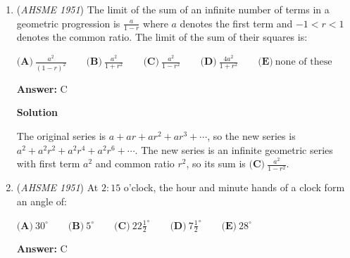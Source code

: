 \begin{enumerate}
 \textbf{Answer: }C



\textbf{Solution}

The well-known area formula for a circle is $A = \pi r^2$, so doubling the radius will result it quadrupling the area (since $A' = \pi (2r)^2 = 4 \pi r^2 = 4A$). Statement $\boxed{\textbf{(C)}}$ is therefore incorrect, and is the correct answer choice.

 
Statements $\textbf{(A)}$ and $\textbf{(B)}$ are evidently correct, since in triangles the area is directly proportional to both the base and the height ($A = \frac{1}{2} bh$). Statement $\textbf{(D)}$ is also correct: let $q = \frac{a}{b}$. Then $q' = \frac{a \div 2}{2b} = \frac{a}{4b} = \frac{q}{4}$, which is a change from $q$. Finally, statement $\textbf{(E)}$ is true: $2x < x$ if $x < 0$, as doubling a negative number makes it even more negative (and therefore less than it originally was).

 


	\item (\textit{AHSME 1951}) The limit of the sum of an infinite number of terms in a geometric progression is $\frac {a}{1- r}$ where $a$ denotes the first term and $-1 < r < 1$ denotes the common ratio. The limit of the sum of their squares is:


 $\textbf{(A)}\ \frac {a^2}{(1 -r)^2} \qquad\textbf{(B)}\ \frac {a^2}{1 + r^2} \qquad\textbf{(C)}\ \frac {a^2}{1 - r^2} \qquad\textbf{(D)}\ \frac {4a^2}{1+ r^2} \qquad\textbf{(E)}\ \text{none of these}$

 \textbf{Answer: }C



\textbf{Solution}

The original series is $a + ar + ar^2 + ar^3 + \cdots$, so the new series is $a^2 + a^2r^2 +a^2r^4 +a^2r^6+\cdots$.  The new series is an infinite geometric series with first term $a^2$ and common ratio $r^2$, so its sum is $\boxed{\textbf{(C)}\ \frac {a^2}{1 - r^2}}$.

 


	\item (\textit{AHSME 1951}) At $2: 15$ o'clock, the hour and minute hands of a clock form an angle of:


 $\textbf{(A)}\ 30^{\circ} \qquad\textbf{(B)}\ 5^{\circ} \qquad\textbf{(C)}\ 22\frac {1}{2}^{\circ} \qquad\textbf{(D)}\ 7\frac {1}{2} ^{\circ} \qquad\textbf{(E)}\ 28^{\circ}$

 \textbf{Answer: }C




\end{enumerate}
